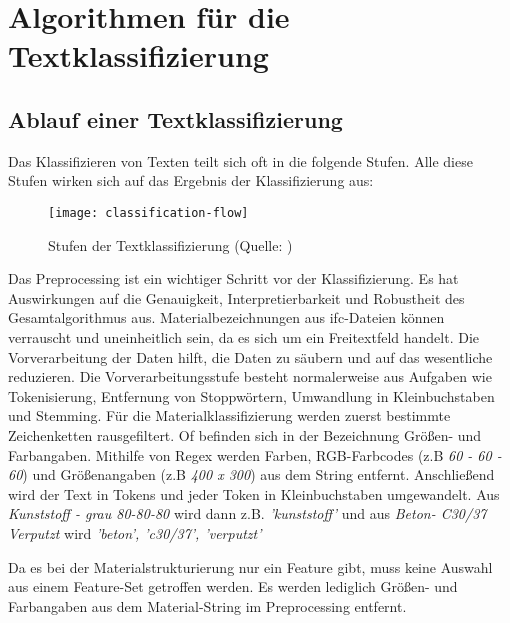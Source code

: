 \section{Algorithmen für die Textklassifizierung}
\label{c:conception:classification}
\subsection{Ablauf einer Textklassifizierung}
\label{c:conception:classification:steps}

Das Klassifizieren von Texten teilt sich oft in die folgende Stufen. Alle diese Stufen wirken sich auf das Ergebnis der Klassifizierung aus:

\begin{figure}[H]
	\centering
	\texttt{[image: classification-flow]}
	\caption[Textklassifizierung]{Stufen der Textklassifizierung (Quelle:  \cite{Foram_2016})}
	\label{fig:classification flow}
\end{figure}

Das Preprocessing ist ein wichtiger Schritt vor der Klassifizierung. Es hat Auswirkungen auf die Genauigkeit, Interpretierbarkeit und Robustheit des Gesamtalgorithmus aus. \citep{Zelaya_2019} Materialbezeichnungen aus \ac{ifc}-Dateien können verrauscht und uneinheitlich sein, da es sich um ein Freitextfeld handelt. Die Vorverarbeitung der Daten hilft, die Daten zu säubern und auf das wesentliche reduzieren. \citep{Priyanga_2016}
Die Vorverarbeitungsstufe besteht normalerweise aus Aufgaben wie Tokenisierung, Entfernung von Stoppwörtern, Umwandlung in Kleinbuchstaben und Stemming. \citep{Uysal_2014}
Für die Materialklassifizierung werden zuerst bestimmte Zeichenketten rausgefiltert. Of befinden sich in der Bezeichnung Größen- und Farbangaben.
Mithilfe von Regex werden Farben, RGB-Farbcodes (z.B \textit{60 - 60 - 60}) und Größenangaben (z.B \textit{400 x 300}) aus dem String entfernt. Anschließend wird der Text in Tokens und jeder Token in Kleinbuchstaben umgewandelt. Aus \textit{\glqq Kunststoff - grau 80-80-80\grqq{}} wird dann z.B. \textit{\glqq 'kunststoff'\grqq{}} und aus \textit{\glqq Beton- C30/37 Verputzt\grqq{}} wird \textit{\glqq 'beton', 'c30/37', 'verputzt'\grqq{}}

Da es bei der Materialstrukturierung nur ein Feature gibt, muss keine Auswahl aus einem Feature-Set getroffen werden. Es werden lediglich Größen- und Farbangaben aus dem Material-String im Preprocessing entfernt.

